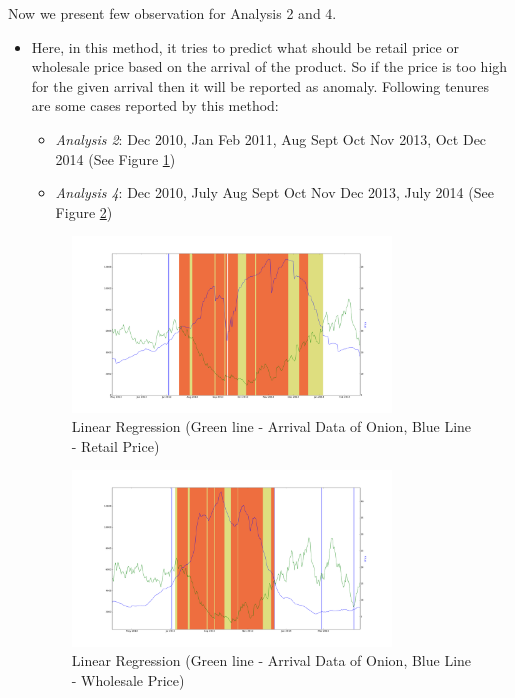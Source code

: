 \documentclass[a4paper,10pt]{report}
\begin{document}
		
		Now we present few observation for Analysis 2 and 4.
		
		
		\begin{itemize}
			\item Here, in this method, it tries to predict what should be retail price or wholesale price based on the arrival of the product. So if the price is too high for the given arrival then it will be reported as anomaly.
			Following tenures are some cases reported by this method:
			\begin{itemize}
				\item \textit{Analysis 2}: Dec 2010, Jan Feb 2011, Aug Sept Oct Nov 2013, Oct Dec 2014 (See Figure \ref{fig:12221})
				\item \textit{Analysis 4}: Dec 2010, July Aug Sept Oct Nov Dec 2013, July 2014 (See Figure \ref{fig:12241})
			\end{itemize}
			\begin{figure}[H]
		    	\centering
  		    	\includegraphics[width=0.8\textwidth]{graphs/12221.png}
		    	\caption{Linear Regression (Green line - Arrival Data of Onion, Blue Line - Retail Price)}
		    	\label{fig:12221}
			\end{figure}
			
			\begin{figure}[H]
		    	\centering
  		    	\includegraphics[width=0.8\textwidth]{graphs/12241.png}
		    	\caption{Linear Regression (Green line - Arrival Data of Onion, Blue Line - Wholesale Price)}
		    	\label{fig:12241}
			\end{figure}
			

\end{itemize}
\end{document}
